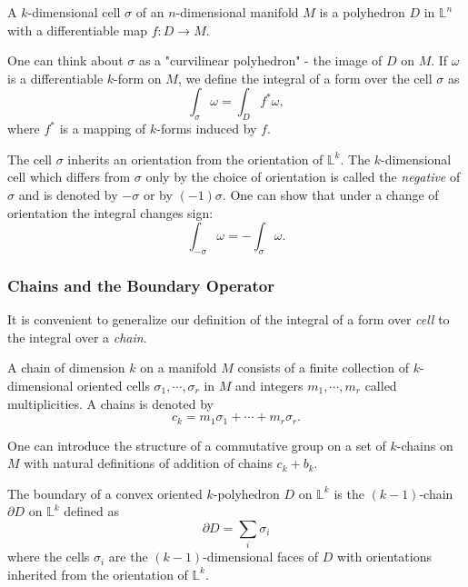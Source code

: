 \begin{definition}
A $k$-dimensional cell $\sigma$ of an $n$-dimensional manifold $M$ is
a polyhedron $D$ in $\mathbb{L}^n$ with a differentiable map $f:D\rightarrow
M$.
\end{definition}
One can think about $\sigma$ as a "curvilinear polyhedron" - the image of $D$
on $M$. If $\omega$ is a differentiable $k$-form on $M$, we define the integral
of a form over the cell $\sigma$ as
\begin{equation}
  \int_\sigma{\omega} = \int_D{f^*\omega},
\end{equation}
where $f^*$ is a mapping of $k$-forms induced by $f$.
\par The cell $\sigma$ inherits an orientation from the orientation of
$\mathbb{L}^k$. The $k$-dimensional cell which differs from $\sigma$ only by
the choice of orientation is called the \textit{negative} of $\sigma$ and is
denoted by $-\sigma$ or by $(-1)\sigma$. One can show that under a change of
orientation the integral changes sign:
\begin{equation}
  \int_{-\sigma}{\omega}=-\int_{\sigma}{\omega}.
\end{equation}

\subsubsection{Chains and the Boundary Operator}
It is convenient to generalize our definition of the integral of a form over
\textit{cell} to the integral over a \textit{chain}.
\begin{definition}
  A chain of dimension $k$ on a manifold $M$ consists of a finite collection of
  $k$-dimensional oriented cells $\sigma_1,\cdots,\sigma_r$ in $M$ and integers
  $m_1,\cdots,m_r$ called multiplicities. A chains is denoted by
  \begin{equation}
    c_k = m_1\sigma_1+\cdots+m_r\sigma_r .
  \end{equation}
\end{definition}
One can introduce the structure of a commutative group on a set of $k$-chains
on $M$ with natural definitions of addition of chains $c_k + b_k$.
\begin{definition}
  The boundary of a convex oriented $k$-polyhedron $D$ on $\mathbb{L}^k$ is the
  $(k-1)$-chain $\partial D$ on $\mathbb{L}^k$ defined as
  \begin{equation}
    \partial D = \sum_i{\sigma_i}
  \end{equation}
  where the cells $\sigma_i$ are the $(k-1)$-dimensional faces of $D$ with
  orientations inherited from the orientation of $\mathbb{L}^k$.
\end{definition}

